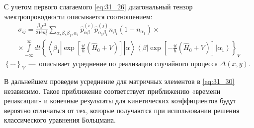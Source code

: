 С учетом первого слагаемого \eqref{eq:31_26} диагональный тензор
электропроводности описывается соотношением:
\begin{multline}\label{eq:31_30}
\displaystyle\sigma_{ij}=\frac{\beta_0 e^2}{2Vm_e^2}
\sum\limits_{\alpha,\beta ,\beta_1 ,\alpha_1 } \hat {p}_{\alpha \beta}^{(i)} \hat{p}_{\alpha_1 \beta_1}^{(j)}
n_{\beta_1} \left( 1 - n_{\alpha_1}\right)\times\\
\times\int\limits_{- \infty }^\infty {dt \left\{ \left\langle\beta_1 \left| \exp\left[\frac{it}{\hbar}\left(\hat{H}_0 + V\right)\right]	\right|\alpha\right\rangle \right.} \displaystyle\left.\left\langle \beta\right|\exp\left[-\frac{it}{\hbar}\left(\hat{H}_0 + V\right)\right] \left|\alpha_1\right\rangle\right\}_V
\end{multline}
${\left\{\cdots \right\}}_V$~---~описывает усреднение по реализации случайного процесса $\Delta \left(x,y\right)$.

В дальнейшем проведем усреднение для матричных элементов в \eqref{eq:31_30} независимо. Такое приближение соответствует приближению «времени релаксации» \cite{Khamidullin2002} и конечные результаты для кинетических коэффициентов будут вероятно отличаться от тех, которые получаются при использовании решения классического уравнения Больцмана. 

